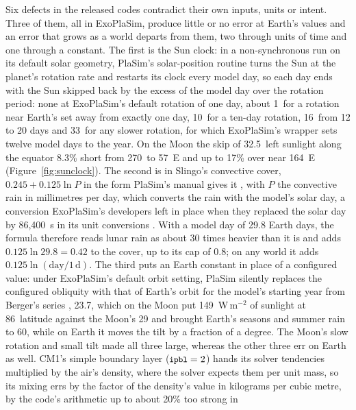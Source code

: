 Six defects in the released codes contradict their own inputs, units or intent. Three of them, all in
ExoPlaSim, produce little or no error at Earth's values and an error that grows as a world departs from them,
two through units of time and one through a constant. The first is the Sun clock: in a non-synchronous run on
its default solar geometry, PlaSim's solar-position routine turns the Sun at the planet's rotation rate and restarts its clock every model
day, so each day ends with the Sun skipped back by the excess of the model day over the rotation period: none at
ExoPlaSim's default rotation of one day, about 1\textdegree\ for a rotation near Earth's set away from exactly one
day, 10\textdegree\ for a ten-day rotation, 16\textdegree\ from 12 to 20 days and 33\textdegree\ for any slower
rotation, for which ExoPlaSim's wrapper sets twelve model days to the year. On the Moon the skip of
32.5\textdegree\ left sunlight along the equator 8.3\% short from 270\textdegree\ to 57\textdegree~E and up to
17\% over near 164\textdegree~E (Figure~\ref{fig:sunclock}). The second is in Slingo's convective cover, $0.245 + 0.125\ln P$ in the form PlaSim's manual gives it \autocite{slingo1991response,lunkeit2012plasim},
with $P$ the convective rain in millimetres per day, which converts the rain with the model's solar day, a
conversion ExoPlaSim's developers left in place when they replaced the solar day by 86,400~s in its unit
conversions \autocite{paradise2022exoplasim}. With a model day of 29.8 Earth days, the formula therefore reads
lunar rain as about 30 times heavier than it is and adds $0.125\ln 29.8 = 0.42$ to the cover, up to its cap of
0.8; on any world it adds $0.125\ln(\text{day}/1\,\text{d})$. The third
puts an Earth constant in place of a configured value: under ExoPlaSim's default orbit setting, PlaSim silently replaces the configured obliquity with that of Earth's orbit for the model's starting year from Berger's series
\autocite{berger1978long}, 23.7\textdegree, which on the Moon put 149~W\,m$^{-2}$ of sunlight at 86\textdegree\
latitude against the Moon's 29 and brought Earth's seasons and summer rain to 60\textdegree, while on Earth it
moves the tilt by a fraction of a degree.\claim{H24} The Moon's slow rotation and small tilt made all three
large, whereas the other three err on Earth as well. CM1's simple boundary layer ($\texttt{\small ipbl} = 2$) hands its solver
tendencies multiplied by the air's density, where the solver expects them per unit mass, so its mixing errs by the
factor of the density's value in kilograms per cubic metre, by the code's arithmetic up to about 20\% too strong in
